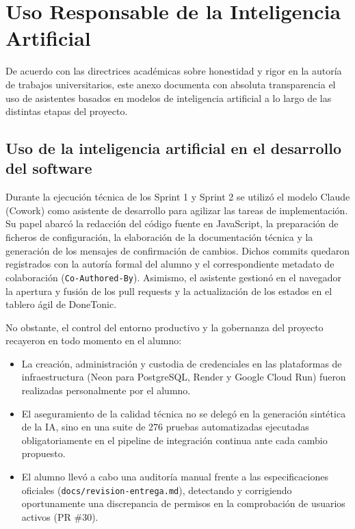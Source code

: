 \chapter{Uso Responsable de la Inteligencia Artificial}
\label{anx:ia}

De acuerdo con las directrices académicas sobre honestidad y rigor en la autoría de trabajos universitarios, este anexo documenta con absoluta transparencia el uso de asistentes basados en modelos de inteligencia artificial a lo largo de las distintas etapas del proyecto.

\section{Uso de la inteligencia artificial en el desarrollo del software}

Durante la ejecución técnica de los Sprint 1 y Sprint 2 se utilizó el modelo Claude (Cowork) como asistente de desarrollo para agilizar las tareas de implementación. Su papel abarcó la redacción del código fuente en JavaScript, la preparación de ficheros de configuración, la elaboración de la documentación técnica y la generación de los mensajes de confirmación de cambios. Dichos commits quedaron registrados con la autoría formal del alumno y el correspondiente metadato de colaboración (\texttt{Co-Authored-By}). Asimismo, el asistente gestionó en el navegador la apertura y fusión de los pull requests y la actualización de los estados en el tablero ágil de DoneTonic.

No obstante, el control del entorno productivo y la gobernanza del proyecto recayeron en todo momento en el alumno:
\begin{itemize}
    \item La creación, administración y custodia de credenciales en las plataformas de infraestructura (Neon para PostgreSQL, Render y Google Cloud Run) fueron realizadas personalmente por el alumno.
    \item El aseguramiento de la calidad técnica no se delegó en la generación sintética de la IA, sino en una suite de 276 pruebas automatizadas ejecutadas obligatoriamente en el pipeline de integración continua ante cada cambio propuesto.
    \item El alumno llevó a cabo una auditoría manual frente a las especificaciones oficiales (\texttt{docs/\allowbreak revision-\allowbreak entrega.md}), detectando y corrigiendo oportunamente una discrepancia de permisos en la comprobación de usuarios activos (PR \#30).
\end{itemize}

